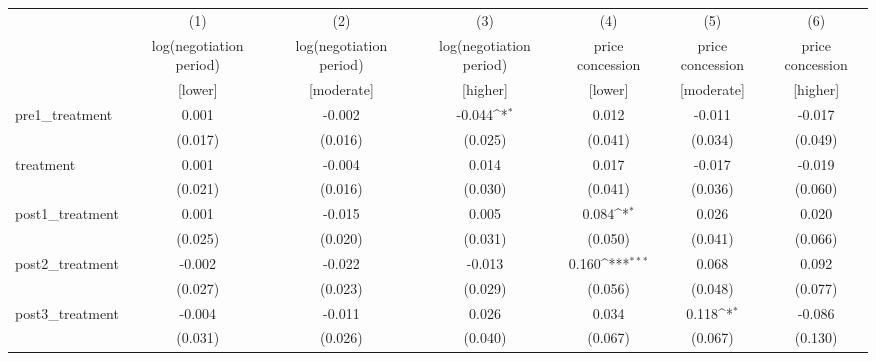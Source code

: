 {
\def\sym#1{\ifmmode^{#1}\else\(^{#1}\)\fi}
\begin{adjustbox}{max width=\textwidth}
\begin{tabular}{l*{6}{c}}
\toprule
            &\multicolumn{1}{c}{(1)}&\multicolumn{1}{c}{(2)}&\multicolumn{1}{c}{(3)}&\multicolumn{1}{c}{(4)}&\multicolumn{1}{c}{(5)}&\multicolumn{1}{c}{(6)}\\
            &\multicolumn{1}{c}{log(negotiation period)}&\multicolumn{1}{c}{log(negotiation period)}&\multicolumn{1}{c}{log(negotiation period)}&\multicolumn{1}{c}{price concession}&\multicolumn{1}{c}{price concession}&\multicolumn{1}{c}{price concession}\\
&[lower]&[moderate]&[higher]&[lower]&[moderate]&[higher]\\
\midrule
pre1\_treatment&       0.001         &      -0.002         &      -0.044\sym{*}  &       0.012         &      -0.011         &      -0.017         \\
            &     (0.017)         &     (0.016)         &     (0.025)         &     (0.041)         &     (0.034)         &     (0.049)         \\
\addlinespace
treatment   &       0.001         &      -0.004         &       0.014         &       0.017         &      -0.017         &      -0.019         \\
            &     (0.021)         &     (0.016)         &     (0.030)         &     (0.041)         &     (0.036)         &     (0.060)         \\
\addlinespace
post1\_treatment&       0.001         &      -0.015         &       0.005         &       0.084\sym{*}  &       0.026         &       0.020         \\
            &     (0.025)         &     (0.020)         &     (0.031)         &     (0.050)         &     (0.041)         &     (0.066)         \\
\addlinespace
post2\_treatment&      -0.002         &      -0.022         &      -0.013         &       0.160\sym{***}&       0.068         &       0.092         \\
            &     (0.027)         &     (0.023)         &     (0.029)         &     (0.056)         &     (0.048)         &     (0.077)         \\
\addlinespace
post3\_treatment&      -0.004         &      -0.011         &       0.026         &       0.034         &       0.118\sym{*}  &      -0.086         \\
            &     (0.031)         &     (0.026)         &     (0.040)         &     (0.067)         &     (0.067)         &     (0.130)         \\

\end{tabular}
\end{adjustbox}}
